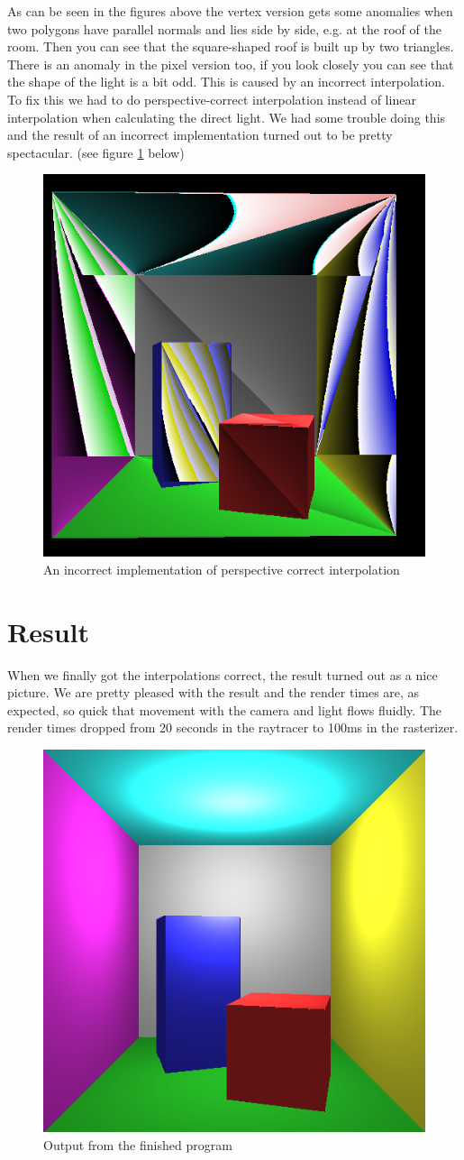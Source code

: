 \documentclass[a4paper,11pt]{article}
\begin{document}
As can be seen in the figures above the vertex version gets some anomalies when two polygons have parallel normals and lies side by side, e.g. at the roof of the room. Then you can see that the square-shaped roof is built up by two triangles. There is an anomaly in the pixel version too, if you look closely you can see that the shape of the light is a bit odd. This is caused by an incorrect interpolation. To fix this we had to do perspective-correct interpolation instead of linear interpolation when calculating the direct light. We had some trouble doing this and the result of an incorrect implementation turned out to be pretty spectacular. (see figure \ref{fun} below)
\begin{figure}[h!]
	\centering
	\includegraphics[width=0.3\linewidth]{fun.png}
	\caption{An incorrect implementation of perspective correct interpolation}
	\label{fun}
\end{figure}
\clearpage

\section{Result}
When we finally got the interpolations correct, the result turned out as a nice picture. We are pretty pleased with the result and the render times are, as expected, so quick that movement with the camera and light flows fluidly. The render times dropped from 20 seconds in the raytracer to 100ms in the rasterizer. 
\begin{figure}[h!]
	\centering
	\includegraphics[width=0.4\linewidth]{screenshot5.png}
	\caption{Output from the finished program}
	\label{fig5}
\end{figure}
\end{document}
